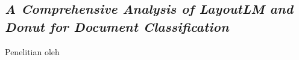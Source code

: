 \subsection{\textit{A Comprehensive Analysis of LayoutLM and Donut for Document Classification}}
\label{sec:penelitian-1}
Penelitian oleh \cite{}